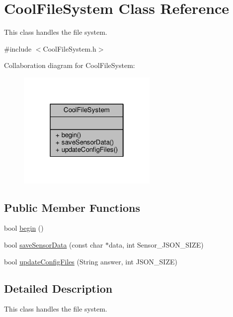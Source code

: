 \hypertarget{classCoolFileSystem}{}\section{Cool\+File\+System Class Reference}
\label{classCoolFileSystem}


This class handles the file system.  




{\ttfamily \#include $<$Cool\+File\+System.\+h$>$}



Collaboration diagram for Cool\+File\+System\+:
\nopagebreak
\begin{figure}[H]
\begin{center}
\leavevmode
\includegraphics[width=190pt]{classCoolFileSystem__coll__graph}
\end{center}
\end{figure}
\subsection*{Public Member Functions}
\begin{DoxyCompactItemize}
\item 
bool \hyperlink{classCoolFileSystem_a6ba6f666ed4c530174f8569d2c636748}{begin} ()
\item 
bool \hyperlink{classCoolFileSystem_a4c560c2ddd40b74b7758e6ceb2c58957}{save\+Sensor\+Data} (const char $\ast$data, int Sensor\+\_\+\+J\+S\+O\+N\+\_\+\+S\+I\+ZE)
\item 
bool \hyperlink{classCoolFileSystem_a32dad79ae80182a83e2e8f52286b7c7b}{update\+Config\+Files} (String answer, int J\+S\+O\+N\+\_\+\+S\+I\+ZE)
\end{DoxyCompactItemize}


\subsection{Detailed Description}
This class handles the file system. 

